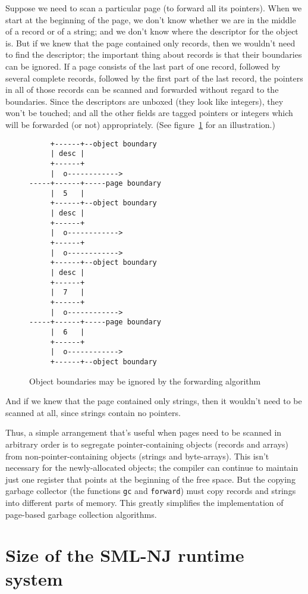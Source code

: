 Suppose we need to scan a particular page (to forward all its pointers).
When we start at the beginning of the page, we don't know whether
we are in the middle of a record or of a string; and we don't know
where the descriptor for the object is.
But if we knew that the page contained only records, then we wouldn't need
to find the descriptor;
the important thing about records is that their boundaries can be ignored.
If a page consists of the last part of one record, followed by several
complete records, followed by the first part of the last record, the
pointers in all of those records can be scanned and forwarded
without regard to the boundaries.  Since the descriptors are unboxed
(they look like integers), they won't be touched; and all the other
fields are tagged pointers or integers which will be forwarded (or not)
appropriately.  (See figure~\ref{boundaries} for an illustration.)
\begin{figure}[htbp]
\label{boundaries}
\begin{verbatim}
     +------+--object boundary
     | desc |
     +------+
     |  o------------>
-----+------+-----page boundary
     |  5   |
     +------+--object boundary
     | desc |
     +------+
     |  o------------>
     +------+
     |  o------------>
     +------+--object boundary
     | desc |
     +------+
     |  7   |
     +------+
     |  o------------>
-----+------+-----page boundary
     |  6   |
     +------+
     |  o------------>
     +------+--object boundary
\end{verbatim}
\caption{Object boundaries may be ignored by the forwarding algorithm}
\end{figure}

And if we knew that the page contained only strings, then it wouldn't
need to be scanned at all, since strings contain no pointers.

Thus, a simple arrangement that's useful when pages need to be scanned
in arbitrary order is
to segregate pointer-containing objects (records and arrays) from
non-pointer-containing objects (strings and byte-arrays).  This isn't necessary
for the newly-allocated objects; the compiler can continue to maintain
just one register that points at the beginning of the free space.  But
the copying garbage collector (the functions \verb"gc" and \verb"forward")
must copy records and strings into different parts of memory.
This greatly simplifies the implementation of page-based garbage collection
algorithms.

\section{Size of the SML-NJ runtime system}
\label{size}

